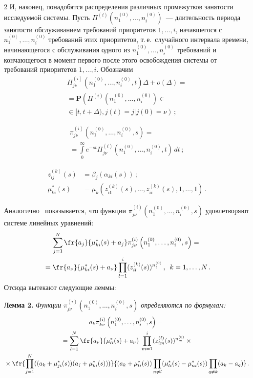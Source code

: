 \begin{multicols}{2}
И, наконец, понадобятся распределения различных промежутков
занятости исследуемой сис\-темы. Пусть $\Pi^{(i)}\left(n_1^{(0)},
\ldots,n_i^{(0)}\right)$~--- длительность\linebreak
 периода занятости
обслуживанием требований приоритетов $1,\ldots,i$, начавшегося с
$n_1^{(0)},\ldots,n_i^{(0)}$ требований этих приоритетов, т.\,е.\
случайного интервала времени, начинающегося с обслуживания одного из
$n_1^{(0)},\ldots,n_i^{(0)}$ требований и кончающегося в момент
первого после этого освобождения системы от требований приоритетов
$1,\ldots,i$. Обозначим
\begin{multline*}
\Pi_{j\nu}^{(i)}\left(n_1^{(0)},\ldots,n_i^{(0)},t\right)\Delta+o(\Delta)={}\\
{}=\mathbf{P}\left(\Pi^{(i)}\left(n_1^{(0)},
\ldots,n_i^{(0)}\right)\in{}\right.\\
\left.{}\in[t,t+\Delta),j(t)=j|j(0)=\nu\right)\,;
\end{multline*}

\vspace*{-12pt}

\noindent
\begin{multline*}
\pi_{j\nu}^{(i)}\left(n_1^{(0)},\ldots,n_i^{(0)},s\right)={}\\
{}=
\int\limits_0^{\infty}e^{-st}\Pi_{j\nu}^{(i)}\left(n_1^{(0)},\ldots,n_i^{(0)},t\right)\,dt\,;
\end{multline*}

\vspace*{-12pt}

\noindent
\begin{align*}
z_{ij}^{(k)}(s)&=\beta_j(\alpha_{ki}(s))\,;\\
\mu_{ki}^{*}(s)&=\mu_k\left(z_{i1}^{(k)}(s),\ldots,z_{ii}^{(k)}(s),1,\ldots,1\right)\,.
\end{align*}

Аналогично~\cite{2-u} показывается, что функции 
$\pi_{j\nu}^{(i)}\left(n_1^{(0)},\ldots,n_i^{(0)},s\right)$ удовлетворяют системе линейных
уравнений:
\begin{multline*}
\sum\limits_{j=1}^N\fr{a_j}{\mu_{ki}^{*}(s)+
a_j}\pi_{j\nu}^{(i)}\left(n_1^{(0)},\ldots,n_i^{(0)},s\right)={}\\
{}=
\fr{a_{\nu}}{\mu_{ki}^{*}(s)+a_{\nu}}\prod\limits_{l=1}^i (z_{il}^{(k)}(s))^{n_l^{(0)}}\,,
\enskip k=1,\ldots,N\,.
\end{multline*}
Отсюда вытекают следующие леммы:

\medskip

\noindent
\textbf{Лемма 2.} \textit{Функции  $\pi_{j\nu}^{(i)}\left(n_1^{(0)},\ldots,n_i^{(0)},s\right)$ определяются по формулам:}
\begin{multline*}
a_k\pi_{k\nu}^{(i)}\left(n_1^{(0)},\ldots,n_i^{(0)},s\right)={}\\
{}=
\sum\limits_{l=1}^N\fr{a_{\nu}}{\mu_{li}^{*}(s)+a_{\nu}}\,
\prod\limits_{m=1}^i (z_{im}^{(l)}(s))^{n_m^{(0)}}\times{} \\ 
{}\times\fr{\prod\limits_{j=1}^N((a_k+\mu_{ji}^{*}(s))(a_j+\mu_{ki}^{*}(s)))}
{(a_k+\mu_{li}^{*}(s))\prod\limits_{n\ne l}(\mu_{li}^{*}(s)-\mu_{ni}^{*}(s))\prod\limits_{q\ne k}(a_k-a_q)}\,.
\end{multline*}


\end{multicols}
